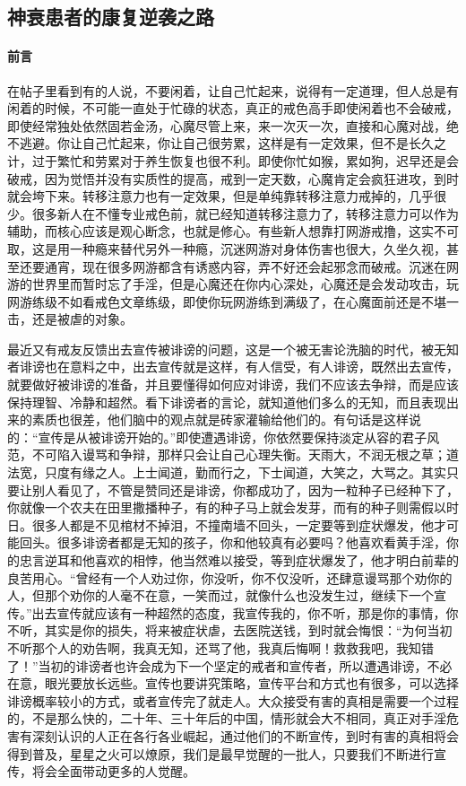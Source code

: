 \subsection{神衰患者的康复逆袭之路}

\paragraph*{前言}

在帖子里看到有的人说，不要闲着，让自己忙起来，说得有一定道理，但人总是有闲着的时候，不可能一直处于忙碌的状态，真正的戒色高手即使闲着也不会破戒，即使经常独处依然固若金汤，心魔尽管上来，来一次灭一次，直接和心魔对战，绝不逃避。你让自己忙起来，你让自己很劳累，这样是有一定效果，但不是长久之计，过于繁忙和劳累对于养生恢复也很不利。即使你忙如猴，累如狗，迟早还是会破戒，因为觉悟并没有实质性的提高，戒到一定天数，心魔肯定会疯狂进攻，到时就会垮下来。转移注意力也有一定效果，但是单纯靠转移注意力戒掉的，几乎很少。很多新人在不懂专业戒色前，就已经知道转移注意力了，转移注意力可以作为辅助，而核心应该是观心断念，也就是修心。有些新人想靠打网游戒撸，这实不可取，这是用一种瘾来替代另外一种瘾，沉迷网游对身体伤害也很大，久坐久视，甚至还要通宵，现在很多网游都含有诱惑内容，弄不好还会起邪念而破戒。沉迷在网游的世界里而暂时忘了手淫，但是心魔还在你内心深处，心魔还是会发动攻击，玩网游练级不如看戒色文章练级，即使你玩网游练到满级了，在心魔面前还是不堪一击，还是被虐的对象。

最近又有戒友反馈出去宣传被诽谤的问题，这是一个被无害论洗脑的时代，被无知者诽谤也在意料之中，出去宣传就是这样，有人信受，有人诽谤，既然出去宣传，就要做好被诽谤的准备，并且要懂得如何应对诽谤，我们不应该去争辩，而是应该保持理智、冷静和超然。看下诽谤者的言论，就知道他们多么的无知，而且表现出来的素质也很差，他们脑中的观点就是砖家灌输给他们的。有句话是这样说的：“宣传是从被诽谤开始的。”即使遭遇诽谤，你依然要保持淡定从容的君子风范，不可陷入谩骂和争辩，那样只会让自己心理失衡。天雨大，不润无根之草；道法宽，只度有缘之人。上士闻道，勤而行之，下士闻道，大笑之，大骂之。其实只要让别人看见了，不管是赞同还是诽谤，你都成功了，因为一粒种子已经种下了，你就像一个农夫在田里撒播种子，有的种子马上就会发芽，而有的种子则需假以时日。很多人都是不见棺材不掉泪，不撞南墙不回头，一定要等到症状爆发，他才可能回头。很多诽谤者都是无知的孩子，你和他较真有必要吗？他喜欢看黄手淫，你的忠言逆耳和他喜欢的相悖，他当然难以接受，等到症状爆发了，他才明白前辈的良苦用心。“曾经有一个人劝过你，你没听，你不仅没听，还肆意谩骂那个劝你的人，但那个劝你的人毫不在意，一笑而过，就像什么也没发生过，继续下一个宣传。”出去宣传就应该有一种超然的态度，我宣传我的，你不听，那是你的事情，你不听，其实是你的损失，将来被症状虐，去医院送钱，到时就会悔恨：“为何当初不听那个人的劝告啊，我真无知，还骂了他，我真后悔啊！救救我吧，我知错了！”当初的诽谤者也许会成为下一个坚定的戒者和宣传者，所以遭遇诽谤，不必在意，眼光要放长远些。宣传也要讲究策略，宣传平台和方式也有很多，可以选择诽谤概率较小的方式，或者宣传完了就走人。大众接受有害的真相是需要一个过程的，不是那么快的，二十年、三十年后的中国，情形就会大不相同，真正对手淫危害有深刻认识的人正在各行各业崛起，通过他们的不断宣传，到时有害的真相将会得到普及，星星之火可以燎原，我们是最早觉醒的一批人，只要我们不断进行宣传，将会全面带动更多的人觉醒。


